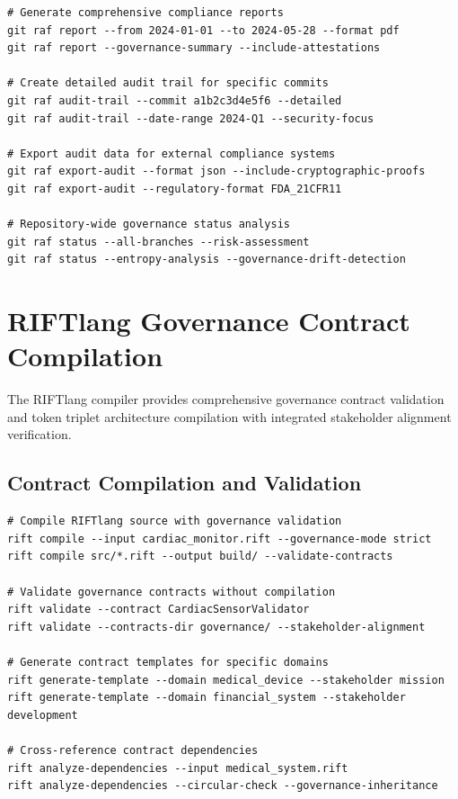 \documentclass[11pt,letterpaper]{article}
\begin{document}
\begin{lstlisting}[language=shell, caption=Git-RAF Audit Commands]
# Generate comprehensive compliance reports
git raf report --from 2024-01-01 --to 2024-05-28 --format pdf
git raf report --governance-summary --include-attestations

# Create detailed audit trail for specific commits
git raf audit-trail --commit a1b2c3d4e5f6 --detailed
git raf audit-trail --date-range 2024-Q1 --security-focus

# Export audit data for external compliance systems
git raf export-audit --format json --include-cryptographic-proofs
git raf export-audit --regulatory-format FDA_21CFR11

# Repository-wide governance status analysis
git raf status --all-branches --risk-assessment
git raf status --entropy-analysis --governance-drift-detection
\end{lstlisting}

\section{RIFTlang Governance Contract Compilation}

The RIFTlang compiler provides comprehensive governance contract validation and token triplet architecture compilation with integrated stakeholder alignment verification.

\subsection{Contract Compilation and Validation}

\begin{lstlisting}[language=shell, caption=RIFTlang Compilation Commands]
# Compile RIFTlang source with governance validation
rift compile --input cardiac_monitor.rift --governance-mode strict
rift compile src/*.rift --output build/ --validate-contracts

# Validate governance contracts without compilation
rift validate --contract CardiacSensorValidator
rift validate --contracts-dir governance/ --stakeholder-alignment

# Generate contract templates for specific domains
rift generate-template --domain medical_device --stakeholder mission
rift generate-template --domain financial_system --stakeholder development

# Cross-reference contract dependencies
rift analyze-dependencies --input medical_system.rift
rift analyze-dependencies --circular-check --governance-inheritance
\end{lstlisting}
\end{document}
